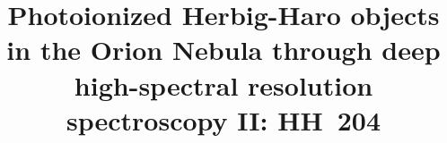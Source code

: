 \documentclass[twocolumn]{aastex63}
\begin{document}
\title{Photoionized Herbig-Haro objects in the Orion Nebula through deep high-spectral resolution spectroscopy II: HH~204}



\end{document}

